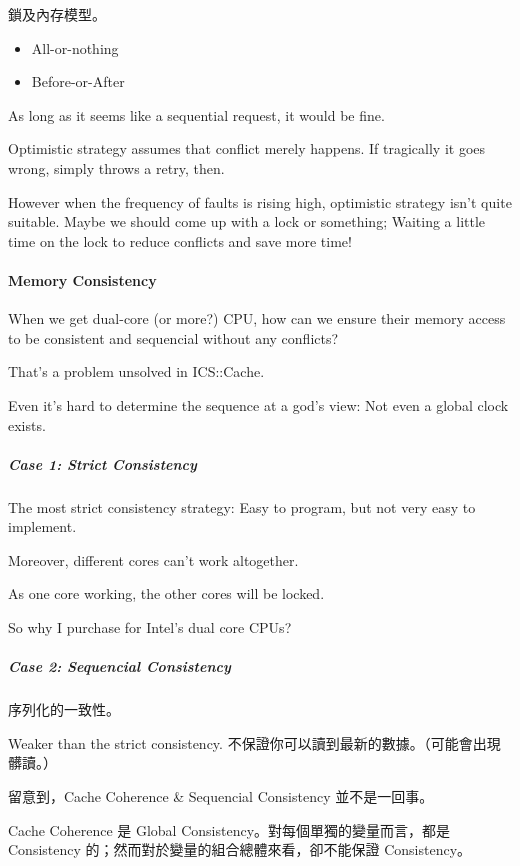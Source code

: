 \documentclass[
]{article}
\begin{document}
鎖及內存模型。

\begin{itemize}
\item
  All-or-nothing
\item
  Before-or-After
\end{itemize}

As long as it seems like a sequential request, it would be fine.

Optimistic strategy assumes that conflict merely happens. If tragically
it goes wrong, simply throws a retry, then.

However when the frequency of faults is rising high, optimistic strategy
isn't quite suitable. Maybe we should come up with a lock or something;
Waiting a little time on the lock to reduce conflicts and save more
time!

\hypertarget{header-n70}{%
\paragraph{Memory Consistency}\label{header-n70}}

When we get dual-core (or more?) CPU, how can we ensure their memory
access to be consistent and sequencial without any conflicts?

That's a problem unsolved in ICS::Cache.

Even it's hard to determine the sequence at a god's view: Not even a
global clock exists.

\hypertarget{header-n74}{%
\subparagraph{Case 1: Strict Consistency}\label{header-n74}}

The most strict consistency strategy: Easy to program, but not very easy
to implement.

Moreover, different cores can't work altogether.

As one core working, the other cores will be locked.

So why I purchase for Intel's dual core CPUs?

\hypertarget{header-n79}{%
\subparagraph{Case 2: Sequencial Consistency}\label{header-n79}}

序列化的一致性。

Weaker than the strict consistency.
不保證你可以讀到最新的數據。（可能會出現髒讀。）

留意到，Cache Coherence \& Sequencial Consistency 並不是一回事。

Cache Coherence 是 Global Consistency。對每個單獨的變量而言，都是
Consistency 的；然而對於變量的組合總體來看，卻不能保證 Consistency。
\end{document}
